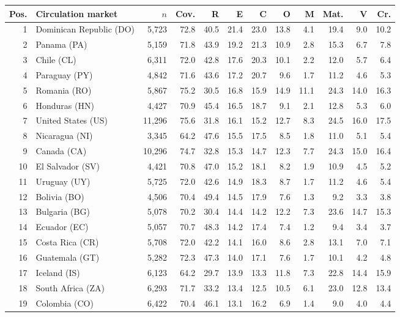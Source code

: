 \documentclass[10pt,a4paper,twocolumn]{article}
\begin{document}
\begin{tabular}{@{}rlrrrrrrrrrr@{}}
\toprule Pos. & Circulation market & $n$ & Cov. & R & E & C & O & M & Mat. & V & Cr. \\
\midrule
1 & Dominican Republic (DO) & 5,723 & 72.8 & 40.5 & 21.4 & 23.0 & 13.8 & 4.1 & 19.4 & 9.0 & 10.2 \\
2 & Panama (PA) & 5,159 & 71.8 & 43.9 & 19.2 & 21.3 & 10.9 & 2.8 & 15.3 & 6.7 & 7.8 \\
3 & Chile (CL) & 6,311 & 72.0 & 42.8 & 17.6 & 20.3 & 10.1 & 2.2 & 12.0 & 5.7 & 6.4 \\
4 & Paraguay (PY) & 4,842 & 71.6 & 43.6 & 17.2 & 20.7 & 9.6 & 1.7 & 11.2 & 4.6 & 5.3 \\
5 & Romania (RO) & 5,867 & 75.2 & 30.5 & 16.8 & 15.9 & 14.9 & 11.1 & 24.3 & 14.0 & 16.3 \\
6 & Honduras (HN) & 4,427 & 70.9 & 45.4 & 16.5 & 18.7 & 9.1 & 2.1 & 12.8 & 5.3 & 6.0 \\
7 & United States (US) & 11,296 & 75.6 & 31.8 & 16.1 & 15.2 & 12.7 & 8.3 & 24.5 & 16.0 & 17.5 \\
8 & Nicaragua (NI) & 3,345 & 64.2 & 47.6 & 15.5 & 17.5 & 8.5 & 1.8 & 11.0 & 5.1 & 5.4 \\
9 & Canada (CA) & 10,296 & 74.7 & 32.8 & 15.3 & 14.7 & 12.3 & 7.7 & 24.3 & 15.0 & 16.4 \\
10 & El Salvador (SV) & 4,421 & 70.8 & 47.0 & 15.2 & 18.1 & 8.2 & 1.9 & 10.9 & 4.5 & 5.2 \\
11 & Uruguay (UY) & 5,725 & 72.0 & 42.6 & 14.9 & 18.3 & 8.7 & 1.7 & 11.2 & 4.6 & 5.4 \\
12 & Bolivia (BO) & 4,506 & 70.4 & 49.4 & 14.5 & 17.9 & 7.6 & 1.3 & 9.2 & 3.3 & 3.8 \\
13 & Bulgaria (BG) & 5,078 & 70.2 & 30.4 & 14.4 & 14.2 & 12.2 & 7.3 & 23.6 & 14.7 & 15.3 \\
14 & Ecuador (EC) & 5,057 & 70.7 & 48.3 & 14.2 & 17.4 & 7.4 & 1.2 & 9.4 & 3.4 & 3.7 \\
15 & Costa Rica (CR) & 5,708 & 72.0 & 42.2 & 14.1 & 16.0 & 8.6 & 2.8 & 13.1 & 7.0 & 7.1 \\
16 & Guatemala (GT) & 5,282 & 72.3 & 47.3 & 14.0 & 17.1 & 7.6 & 1.7 & 10.1 & 4.2 & 4.8 \\
17 & Iceland (IS) & 6,123 & 64.2 & 29.7 & 13.9 & 13.3 & 11.8 & 7.3 & 22.8 & 14.4 & 15.9 \\
18 & South Africa (ZA) & 6,293 & 71.7 & 33.2 & 13.4 & 12.5 & 10.5 & 6.1 & 23.0 & 12.8 & 13.4 \\
19 & Colombia (CO) & 6,422 & 70.4 & 46.1 & 13.1 & 16.2 & 6.9 & 1.4 & 9.0 & 4.0 & 4.4 \\

\end{tabular}
\end{document}
